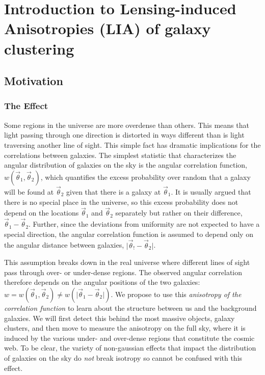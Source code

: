 \section{Introduction to Lensing-induced Anisotropies (LIA) 
of galaxy clustering}\label{sec:lia}

\subsection{Motivation}

\subsubsection{The Effect}
Some regions in the universe are more overdense than
others.  This means that light passing through one direction is
distorted in ways different than is light traversing another line of
sight. This simple fact has dramatic implications for the
correlations between galaxies. The simplest statistic that
characterizes the angular distribution of galaxies on the sky is the
angular correlation function, $w(\vec\theta_1,\vec\theta_2)$, which
quantifies the excess probability over random that a galaxy will be
found at $\vec\theta_2$ given that there is a galaxy at
$\vec\theta_1$. It is usually argued that there is no special place in
the universe, so this excess probability does not depend on the
locations $\vec\theta_1$ and $\vec\theta_2$ separately but rather on
their difference, $\vec\theta_1-\vec\theta_2$. Further, since the
deviations from uniformity are not expected to have a special
direction, the angular correlation function is assumed to depend only
on the angular distance between galaxies, $\vert\vec\theta_!-\vec\theta_2\vert$.

This assumption breaks down in the real universe where different lines
of sight pass through over- or under-dense regions. The observed
angular correlation therefore depends on the angular positions of the
two galaxies: $w=w(\vec\theta_1 ,\vec\theta_2)\ne
w(\vert\vec\theta_1-\vec\theta_2\vert)$. We propose to use this {\it
  anisotropy of the correlation function} to learn about the structure
between us and the background galaxies. We will first detect this
behind the most massive objects, galaxy clusters, and then move to
measure the anisotropy on the full sky, where it is induced by the
various under- and over-dense regions that constitute the cosmic
web. To be clear, the variety of non-gaussian effects that impact the
distribution of galaxies on the sky do {\it not} break isotropy so
cannot be confused with this effect.

